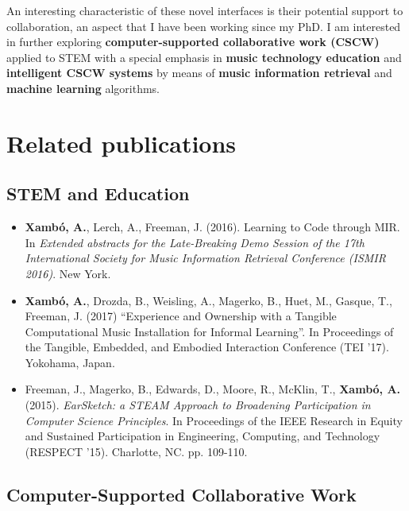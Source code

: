 \documentclass[10pt, a4paper]{article}
\begin{document}
An interesting characteristic of these novel interfaces is their potential support to collaboration, an aspect that I have been working since my PhD. I am interested in further exploring \textbf{computer-supported collaborative work (CSCW)} applied to STEM with a special emphasis in \textbf{music technology education} and \textbf{intelligent CSCW systems} by means of \textbf{music information retrieval} and \textbf{machine learning} algorithms.

\section*{Related publications}

\subsection*{STEM and Education}

\begin{itemize}
\item \textbf{Xambó, A.}, Lerch, A., Freeman, J. (2016). Learning to Code through MIR. In \emph{Extended abstracts for the Late-Breaking Demo Session of the 17th International Society for Music Information Retrieval Conference (ISMIR 2016)}. New York.
\item \textbf{Xambó, A.}, Drozda, B., Weisling, A., Magerko, B., Huet, M., Gasque, T., Freeman, J. (2017) “Experience and Ownership with a Tangible Computational Music Installation for Informal Learning”. In Proceedings of the Tangible, Embedded, and Embodied Interaction Conference (TEI ’17). Yokohama, Japan. 
\item Freeman, J., Magerko, B., Edwards, D., Moore, R., McKlin, T., \textbf{Xambó, A.} (2015). \emph{EarSketch: a STEAM Approach to Broadening Participation in Computer Science Principles}. In Proceedings of the IEEE Research in Equity and Sustained Participation in Engineering, Computing, and Technology (RESPECT '15). Charlotte, NC. pp. 109-110.
\end{itemize}

\subsection*{Computer-Supported Collaborative Work}
\end{document}
